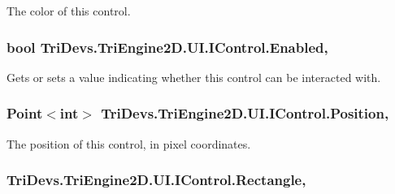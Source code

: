 The color of this control. 

\hypertarget{interface_tri_devs_1_1_tri_engine2_d_1_1_u_i_1_1_i_control_ac9ede42532a11e5b9257b349936cae61}{
\subsubsection[{Enabled}]{\setlength{\rightskip}{0pt plus 5cm}bool Tri\-Devs.\-Tri\-Engine2\-D.\-U\-I.\-I\-Control.\-Enabled\hspace{0.3cm}{\ttfamily [get]}, {\ttfamily [set]}}}\label{interface_tri_devs_1_1_tri_engine2_d_1_1_u_i_1_1_i_control_ac9ede42532a11e5b9257b349936cae61}


Gets or sets a value indicating whether this control can be interacted with. 

\hypertarget{interface_tri_devs_1_1_tri_engine2_d_1_1_u_i_1_1_i_control_a521dee44f18d905b5fc0ee94b0f515a2}{
\subsubsection[{Position}]{\setlength{\rightskip}{0pt plus 5cm}Point$<$int$>$ Tri\-Devs.\-Tri\-Engine2\-D.\-U\-I.\-I\-Control.\-Position\hspace{0.3cm}{\ttfamily [get]}, {\ttfamily [set]}}}\label{interface_tri_devs_1_1_tri_engine2_d_1_1_u_i_1_1_i_control_a521dee44f18d905b5fc0ee94b0f515a2}


The position of this control, in pixel coordinates. 

\hypertarget{interface_tri_devs_1_1_tri_engine2_d_1_1_u_i_1_1_i_control_ab75652686e2cf736e50995aef3dd8183}{
\subsubsection[{Rectangle}]{ Tri\-Devs.\-Tri\-Engine2\-D.\-U\-I.\-I\-Control.\-Rectangle\hspace{0.3cm}{\ttfamily [get]}, {\ttfamily [set]}}}\label{interface_tri_devs_1_1_tri_engine2_d_1_1_u_i_1_1_i_control_ab75652686e2cf736e50995aef3dd8183}



